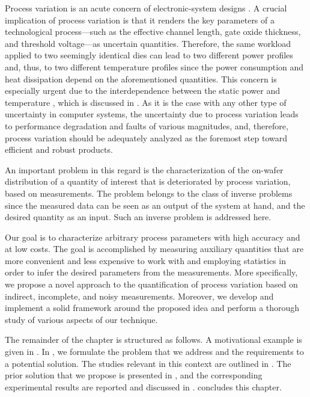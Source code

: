 Process variation is an acute concern of electronic-system designs
\cite{chandrakasan2000, srivastava2010}. A crucial implication of process
variation is that it renders the key parameters of a technological
process---such as the effective channel length, gate oxide thickness, and
threshold voltage---as uncertain quantities. Therefore, the same workload
applied to two seemingly identical dies can lead to two different power profiles
and, thus, to two different temperature profiles since the power consumption and
heat dissipation depend on the aforementioned quantities. This concern is
especially urgent due to the interdependence between the static power and
temperature \cite{liu2007, srivastava2010}, which is discussed in
. As it is the case with any other type of
uncertainty in computer systems, the uncertainty due to process variation leads
to performance degradation and faults of various magnitudes, and, therefore,
process variation should be adequately analyzed as the foremost step toward
efficient and robust products.

An important problem in this regard is the characterization of the on-wafer
distribution of a quantity of interest that is deteriorated by process
variation, based on measurements. The problem belongs to the class of inverse
problems since the measured data can be seen as an output of the system at hand,
and the desired quantity as an input. Such an inverse problem is addressed here.

Our goal is to characterize arbitrary process parameters with high accuracy and
at low costs. The goal is accomplished by measuring auxiliary quantities that
are more convenient and less expensive to work with and employing statistics in
order to infer the desired parameters from the measurements. More specifically,
we propose a novel approach to the quantification of process variation based on
indirect, incomplete, and noisy measurements. Moreover, we develop and implement
a solid framework around the proposed idea and perform a thorough study of
various aspects of our technique.

The remainder of the chapter is structured as follows. A motivational example is
given in . In , we formulate the
problem that we address and the requirements to a potential solution. The
studies relevant in this context are outlined in . The
prior solution that we propose is presented in , and
the corresponding experimental results are reported and discussed in
.  concludes this chapter.



